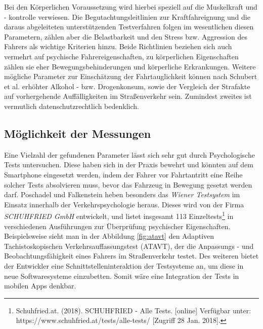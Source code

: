 Bei den Körperlichen Voraussetzung wird hierbei speziell auf die Muskelkraft und - kontrolle verwiesen. Die Begutachtungsleitlinien zur Kraftfahreignung \cite{begutachtungsrichtlinien} und die daraus abgeleiteten unterstützenden Testverfahren \cite{testverfahrenpsychometrischefahreignung} folgen im wesentlichen diesen Parametern, zählen aber die Belastbarkeit und den Stress bzw. Aggression des Fahrers als wichtige Kriterien hinzu. Beide Richtlinien beziehen sich auch vermehrt auf psychische Fahrereigenschaften, zu körperlichen Eigenschaften zählen sie eher Bewegungsbehinderungen und körperliche Erkrankungen. Weitere mögliche Parameter zur Einschätzung der Fahrtauglichkeit können nach Schubert et al. \cite{beurteilungskriterien} erhöhter Alkohol - bzw. Drogenkonsum, sowie der Vergleich der Strafakte auf vorhergehende Auffälligkeiten im Straßenverkehr sein. Zumindest zweites ist vermutlich datenschutzrechtlich bedenklich.

\subsection{Möglichkeit der Messungen}
Eine Vielzahl der gefundenen Parameter lässt sich sehr gut durch Psychologische Tests untersuchen. Diese haben sich in der Praxis bewehrt und könnten auf dem Smartphone eingesetzt werden, indem der Fahrer vor Fahrtantritt eine Reihe solcher Tests absolvieren muss, bevor das Fahrzeug in Bewegung gesetzt werden darf. Poschadel und Falkenstein \cite{testverfahrenpsychometrischefahreignung} heben besonders das \textit{Wiener Testsystem} im Einsatz innerhalb der Verkehrspsychologie heraus. Dieses wird von der Firma \textit{SCHUHFRIED GmbH} entwickelt, und listet insgesamt 113 Einzeltests\footnote{\label{foot:schuhfriedtests} Schuhfried.at. (2018). SCHUHFRIED - Alle Tests. [online] Verfügbar unter: https://www.schuhfried.at/tests/alle-tests/ [Zugriff 28 Jan. 2018].} in verschiedenen Ausführungen zur Überprüfung psychischer Eigenschaften. Beispielsweise sieht man in der Abbildung \ref{fig:atavt} den Adaptiven Tachistoskopischen Verkehrsauffassungstest (ATAVT), der die Anpassungs - und Beobachtungsfähigkeit eines Fahrers im Straßenverkehr testet. Des weiteren bietet der Entwickler eine Schnittstelleninteraktion der Testsysteme an, um diese in neue Softwaresysteme einzubetten. Somit wäre eine Integration der Tests in mobilen Apps denkbar.

\begingroup
	\setcounter{savefootnote}{\value{footnote}}%
	\setcounter{footnote}{2}%
	\renewcommand{\thefootnote}{\alph{footnote}}%
\endgroup

